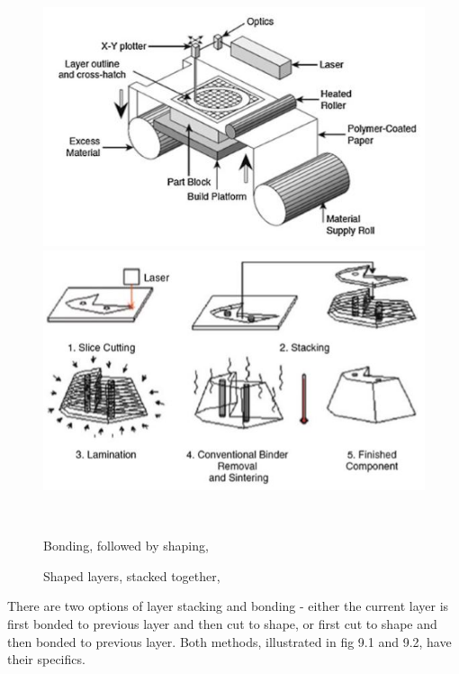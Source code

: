 \documentclass[a4paper, twoside, 11pt]{report}
\begin{document}
\begin{figure}[h!]
  \centering
  \begin{minipage}[b]{0.45\textwidth}
    \includegraphics[width=\textwidth]{SL1}
  \end{minipage}
  \hfill
  \begin{minipage}[b]{0.45\textwidth}
    \includegraphics[width=\textwidth]{SL2}
  \end{minipage}
  \\[5pt]
  \begin{minipage}[t]{0.45\textwidth}
    \caption{Bonding, followed by shaping, \cite[p. 220]{AMT}}
  \end{minipage}
  \hfill
  \begin{minipage}[t]{0.45\textwidth}
    \caption{Shaped layers, stacked together, \cite[p. 223]{AMT}}
  \end{minipage}
\end{figure}

	There are two options of layer stacking and bonding - either the current layer is first bonded to previous layer and then cut to shape, or first cut to shape and then bonded to previous layer. Both methods, illustrated in fig 9.1 and 9.2, have their specifics.
	
\end{document}
